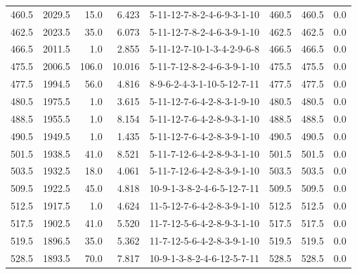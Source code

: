 \begin{tabular}{rrrrlrrr}
 460.5 &  2029.5 &           15.0 &              6.423 &  5-11-12-7-8-2-4-6-9-3-1-10 &         460.5 &           460.5 &       0.0 \\
 462.5 &  2023.5 &           35.0 &              6.073 &  5-11-12-7-8-2-4-6-3-9-1-10 &         462.5 &           462.5 &       0.0 \\
 466.5 &  2011.5 &            1.0 &              2.855 &  5-11-12-7-10-1-3-4-2-9-6-8 &         466.5 &           466.5 &       0.0 \\
 475.5 &  2006.5 &          106.0 &             10.016 &  5-11-7-12-8-2-4-6-3-9-1-10 &         475.5 &           475.5 &       0.0 \\
 477.5 &  1994.5 &           56.0 &              4.816 &  8-9-6-2-4-3-1-10-5-12-7-11 &         477.5 &           477.5 &       0.0 \\
 480.5 &  1975.5 &            1.0 &              3.615 &  5-11-12-7-6-4-2-8-3-1-9-10 &         480.5 &           480.5 &       0.0 \\
 488.5 &  1955.5 &            1.0 &              8.154 &  5-11-12-7-6-4-2-8-9-3-1-10 &         488.5 &           488.5 &       0.0 \\
 490.5 &  1949.5 &            1.0 &              1.435 &  5-11-12-7-6-4-2-8-3-9-1-10 &         490.5 &           490.5 &       0.0 \\
 501.5 &  1938.5 &           41.0 &              8.521 &  5-11-7-12-6-4-2-8-9-3-1-10 &         501.5 &           501.5 &       0.0 \\
 503.5 &  1932.5 &           18.0 &              4.061 &  5-11-7-12-6-4-2-8-3-9-1-10 &         503.5 &           503.5 &       0.0 \\
 509.5 &  1922.5 &           45.0 &              4.818 &  10-9-1-3-8-2-4-6-5-12-7-11 &         509.5 &           509.5 &       0.0 \\
 512.5 &  1917.5 &            1.0 &              4.624 &  11-5-12-7-6-4-2-8-3-9-1-10 &         512.5 &           512.5 &       0.0 \\
 517.5 &  1902.5 &           41.0 &              5.520 &  11-7-12-5-6-4-2-8-9-3-1-10 &         517.5 &           517.5 &       0.0 \\
 519.5 &  1896.5 &           35.0 &              5.362 &  11-7-12-5-6-4-2-8-3-9-1-10 &         519.5 &           519.5 &       0.0 \\
 528.5 &  1893.5 &           70.0 &              7.817 &  10-9-1-3-8-2-4-6-12-5-7-11 &         528.5 &           528.5 &       0.0 \\

\end{tabular}
